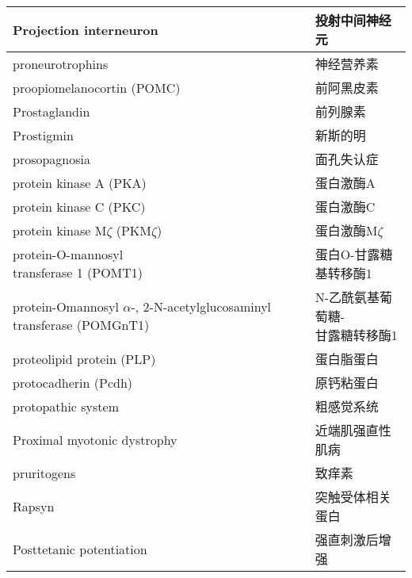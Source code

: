 \begin{longtable}{lll}
	\midrule
	Projection interneuron   && 投射中间神经元  \\
	
	\midrule
	proneurotrophins   && 神经营养素  \\
	
	\midrule
	proopiomelanocortin (POMC)  && 前阿黑皮素  \\
	
	\midrule
	Prostaglandin   && 前列腺素  \\
	
	\midrule
	Prostigmin   && 新斯的明  \\
	
	\midrule
	prosopagnosia   && 面孔失认症  \\
	
	\midrule
	protein kinase A (PKA)   && 蛋白激酶A  \\
	
	\midrule
	protein kinase C (PKC)   && 蛋白激酶C  \\
	
	\midrule
	protein kinase M$\zeta$ (PKM$\zeta$)   && 蛋白激酶M$\zeta$  \\
	
	\midrule
	\makecell[l]{protein-O-mannosyl \\ transferase 1 (POMT1)}     && 蛋白O-甘露糖基转移酶1   \\
	
	\midrule
	\makecell[l]{protein-Omannosyl $\alpha$-,\\2-N-acetylglucosaminyl transferase \\(POMGnT1)}     && \makecell[l]{N-乙酰氨基葡萄糖-\\甘露糖转移酶1}  \\
	
	\midrule
	proteolipid protein (PLP)   && 蛋白脂蛋白  \\
	
	\midrule
	protocadherin (Pcdh)  && 原钙粘蛋白  \\
	
	\midrule
	protopathic system   && 粗感觉系统  \\
	
	\midrule
	Proximal myotonic dystrophy   && 近端肌强直性肌病  \\
	
	\midrule
	pruritogens  && 致痒素  \\
	
	\midrule
	Rapsyn   && 突触受体相关蛋白  \\
	
	\midrule
	Posttetanic potentiation   && 强直刺激后增强  \\
	

\end{longtable}
